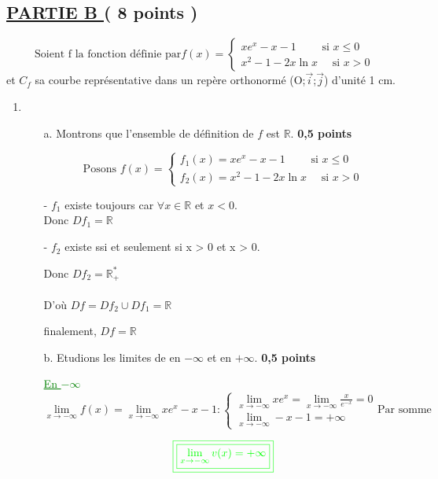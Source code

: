 \documentclass[12pt]{article}
\begin{document}
\subsection*{ \underline{PARTIE B } ( 8 points ) }
\[
\text{Soient f la fonction définie par} 
f(x)=
\begin{cases}
xe^{x}-x-1 \quad\quad  \text{ si }  x \leq 0\\
x^{2}-1-2x\ln x \quad \text{ si } x > 0 
\end{cases}
\]
et $C_{f}$ sa courbe représentative dans un repère orthonormé (O;$\vec{i}$;$\vec{j}$) d'unité 1 cm.
\begin{enumerate}
\item
\begin{enumerate}
\item[a.] Montrons que l'ensemble de définition de $f$ est $\mathbb{R}$.\textbf{ 0,5 points}

\[
\text{Posons } 
f(x)=
\begin{cases}
f_{1}(x)=xe^{x}-x-1 \quad\quad  \text{ si }  x \leq 0\\
f_{2}(x)=x^{2}-1-2x\ln x \quad \text{ si } x > 0 
\end{cases}
\]
\item[-] $f_{1}$ existe toujours car $\forall x\in\mathbb{R}$ et $x<0$. \\

Donc $Df_{1}=\mathbb{R}$

\item[-] $f_{2}$ existe ssi et seulement si x > 0 et x > 0.

Donc $Df_{2}=\mathbb{R}_{+}^{*}$
\\\\
D'où $Df=Df_{2}\cup Df_{1}=\mathbb{R}$

finalement, $Df=\mathbb{R}$
\item[b.] Etudions les limites de en $-\infty$ et en $+\infty$.\textbf{ 0,5 points}

\textcolor{green}{\underline{En $-\infty$}}
\[
\lim_{x \to -\infty}f(x)=\lim_{x \to -\infty}xe^{x}-x-1 : 
\begin{cases}
\lim_{x \to -\infty}xe^{x}=\lim_{x \to -\infty}\frac{x}{e^{-x}}=0\\
\lim_{x \to -\infty}-x-1=+\infty
\end{cases}
\text{Par somme}
\]

\[\textcolor{green}{\boxed{\textcolor{green}{\boxed{\lim_{x\to -\infty}v(x)=+\infty}}}}\]


\end{enumerate}
\end{enumerate}
\end{document}
